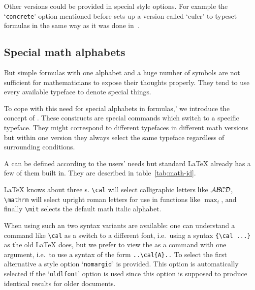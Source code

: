  Other versions could be provided in special style options. For
 example the `{\tt concrete}' option mentioned before sets up
 a version called `euler' to typeset formulas in the same way as it
 was done in~\cite{ConcreteMath}.
 
 
 \subsection{Special math alphabets}
 
 But simple formulas with one alphabet and a huge number of symbols
 are not sufficient for mathematicians to expose their thoughts
 properly.  They tend to use every available typeface to denote
 special things.
 
 To cope with this need for special alphabets in formulas,' we introduce
 the concept of .  These constructs are
 special commands which switch to a specific typeface.  They might
 correspond to different typefaces in different math versions but
 within one version they always select the same typeface regardless of
 surrounding conditions.
 
 A  can be defined according to
 the users' needs but standard \LaTeX{} already has a few of them built
 in. They are described in table~\ref{tab:math-id}.
\begin{table*}
 \rightskip\leftskip
  \LaTeX{} knows about three s.  \verb=\cal= will select calligraphic
  letters like $\cal A \cal B \cal C \cal D$,
  \verb=\mathrm= will select upright roman letters for
  use in functions like $\max_i$, and finally
  \verb=\mit= selects the default math italic alphabet.
\caption{Predefined  in \LaTeX}
\label{tab:math-id}
\end{table*}
 
 When using such an  two
 syntax variants are available:  one can understand a
 command like \verb+\cal+ as a switch to a different
 font, i.e.\ using a syntax \verb+{\cal ...}+ as the
 old \LaTeX{} does, but we prefer to view the
   as a command with one
 argument, i.e.\ to use a syntax of the form
 \verb+..\cal{A}..+ To select the first alternative a
 style option `{\tt nomargid}' is provided.  This option
 is automatically selected if the `{\tt oldlfont}' option
 is used since this option is supposed to produce
 identical results for older documents.
 
